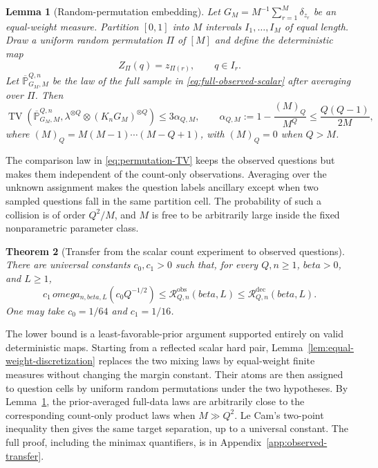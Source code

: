 \documentclass[11pt]{article}
\def\beta{beta}%
\def\omega{omega}%
\newtheorem{theorem}{Theorem}[section]
\newtheorem{lemma}[theorem]{Lemma}
\newcommand{\TV}{\operatorname{TV}}
\newcommand{\calR}{\mathcal R}
\begin{document}
\begin{lemma}[Random-permutation embedding]
\label{lem:permutation-embedding}
Let $G_M=M^{-1}\sum_{r=1}^M\delta_{z_r}$ be an equal-weight measure.  Partition $[0,1]$ into $M$ intervals $I_1,\dots,I_M$ of equal length.  Draw a uniform random permutation $\Pi$ of $[M]$ and define the deterministic map
\[
Z_\Pi(q)=z_{\Pi(r)},
\qquad q\in I_r.
\]
Let $\overline{\mathbb P}^{Q,n}_{G_M,M}$ be the law of the full sample in \eqref{eq:full-observed-scalar} after averaging over $\Pi$.  Then
\begin{equation}
\label{eq:permutation-TV}
\TV\!\left(
\overline{\mathbb P}^{Q,n}_{G_M,M},
\lambda^{\otimes Q}\otimes(K_nG_M)^{\otimes Q}
\right)
\le
3\alpha_{Q,M},
\qquad
\alpha_{Q,M}
:=
1-\frac{(M)_Q}{M^Q}
\le
\frac{Q(Q-1)}{2M},
\end{equation}
where $(M)_Q=M(M-1)\cdots(M-Q+1)$, with $(M)_Q=0$ when $Q>M$.
\end{lemma}

The comparison law in \eqref{eq:permutation-TV} keeps the observed questions but makes them independent of the count-only observations.  Averaging over the unknown assignment makes the question labels ancillary except when two sampled questions fall in the same partition cell.  The probability of such a collision is of order $Q^2/M$, and $M$ is free to be arbitrarily large inside the fixed nonparametric parameter class.

\begin{theorem}[Transfer from the scalar count experiment to observed questions]
\label{thm:observed-transfer}
There are universal constants $c_0,c_1>0$ such that, for every $Q,n\ge1$, $\beta>0$, and $L\ge1$,
\begin{equation}
\label{eq:observed-transfer}
 c_1\,\omega_{n,\beta,L}(c_0Q^{-1/2})
\le
\calR^{\mathrm{obs}}_{Q,n}(\beta,L)
\le
\calR^{\mathrm{dec}}_{Q,n}(\beta,L).
\end{equation}
One may take $c_0=1/64$ and $c_1=1/16$.
\end{theorem}

The lower bound is a least-favorable-prior argument supported entirely on valid deterministic maps.  Starting from a reflected scalar hard pair, Lemma~\ref{lem:equal-weight-discretization} replaces the two mixing laws by equal-weight finite measures without changing the margin constant.  Their atoms are then assigned to question cells by uniform random permutations under the two hypotheses.  By Lemma~\ref{lem:permutation-embedding}, the prior-averaged full-data laws are arbitrarily close to the corresponding count-only product laws when $M\gg Q^2$.  Le Cam's two-point inequality then gives the same target separation, up to a universal constant.  The full proof, including the minimax quantifiers, is in Appendix~\ref{app:observed-transfer}.
\end{document}

